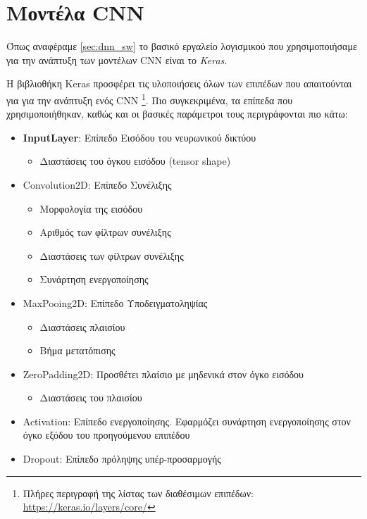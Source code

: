 \section{Μοντέλα CNN}
\label{sec:cnn_impl}

Όπως αναφέραμε \autoref{sec:dnn_sw} το βασικό εργαλείο λογισμικού που
χρησιμοποιήσαμε για την ανάπτυξη των μοντέλων CNN είναι το \emph{Keras}.

Η βιβλιοθήκη Keras προσφέρει τις υλοποιήσεις όλων των επιπέδων που
απαιτούνται για για την ανάπτυξη ενός CNN
\footnote{Πλήρες περιγραφή της λίστας των διαθέσιμων επιπέδων: \href{https://keras.io/layers/core/}{https://keras.io/layers/core/}}.
Πιο συγκεκριμένα, τα επίπεδα που χρησιμοποιήθηκαν, καθώς και οι βασικές
παράμετροι τους περιγράφονται πιο κάτω:
\begin{itemize}
  \item{\textbf{InputLayer}: Επίπεδο Εισόδου του νευρωνικού δικτύου}
    \begin{itemize}
      \item{Διαστάσεις του όγκου εισόδου (tensor shape)}
    \end{itemize}
  \item{Convolution2D: Επίπεδο Συνέλιξης}
    \begin{itemize}
      \item{Μορφολογία της εισόδου}
      \item{Αριθμός των φίλτρων συνέλιξης}
      \item{Διαστάσεις των φίλτρων συνέλιξης}
      \item{Συνάρτηση ενεργοποίησης}
    \end{itemize}
  \item{MaxPooing2D: Επίπεδο Υποδειγματοληψίας}
    \begin{itemize}
      \item{Διαστάσεις πλαισίου}
      \item{Βήμα μετατόπισης}
    \end{itemize}
  \item{ZeroPadding2D: Προσθέτει πλαίσιο με μηδενικά στον όγκο εισόδου}
    \begin{itemize}
      \item{Διαστάσεις του πλαισίου}
    \end{itemize}
  \item{Activation: Επίπεδο ενεργοποίησης. Εφαρμόζει συνάρτηση ενεργοποίησης στον
    όγκο εξόδου του προηγούμενου επιπέδου}
  \item{Dropout: Επίπεδο πρόληψης υπέρ-προσαρμογής \cite{lecun2015deep}}

\end{itemize}
